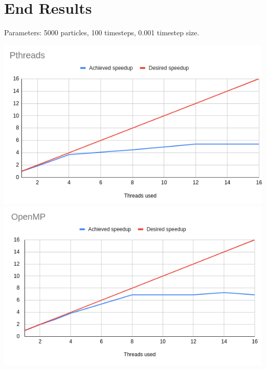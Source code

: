 \documentclass{report}
\begin{document}
\section{End Results}
Parameters: 5000 particles, 100 timesteps, 0.001 timestep size.




\includegraphics[width=\textwidth]{pthreads.png}
\includegraphics[width=\textwidth]{openmp.png}




\end{document}
